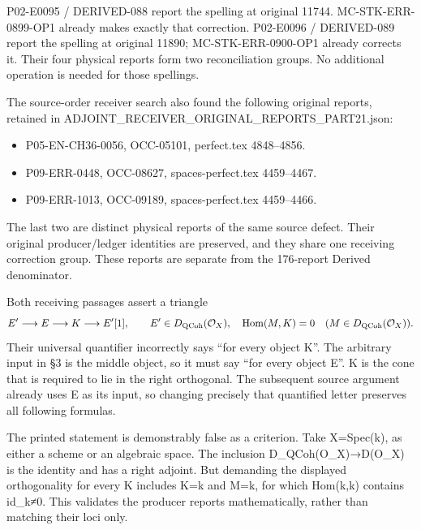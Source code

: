 \documentclass[11pt]{article}
\providecommand{\tightlist}{\setlength{\itemsep}{0pt}\setlength{\parskip}{0pt}}
\begin{document}
P02-E0095 /\allowbreak{} DERIVED-088 report the spelling at original 11744. MC-STK-ERR-0899-OP1 already makes exactly that correction. P02-E0096 /\allowbreak{} DERIVED-089 report the spelling at original 11890; MC-STK-ERR-0900-OP1 already corrects it. Their four physical reports form two reconciliation groups. No additional operation is needed for those spellings.

The source-order receiver search also found the following original reports,\allowbreak{} retained in ADJOINT\_\allowbreak{}RECEIVER\_\allowbreak{}ORIGINAL\_\allowbreak{}REPORTS\_\allowbreak{}PART21.json:\allowbreak{}

\begin{itemize}
\tightlist
\item
  P05-EN-CH36-0056,\allowbreak{} OCC-05101,\allowbreak{} perfect.tex 4848–\allowbreak{}4856.
\item
  P09-ERR-0448,\allowbreak{} OCC-08627,\allowbreak{} spaces-perfect.tex 4459–\allowbreak{}4467.
\item
  P09-ERR-1013,\allowbreak{} OCC-09189,\allowbreak{} spaces-perfect.tex 4459–\allowbreak{}4466.
\end{itemize}

The last two are distinct physical reports of the same source defect. Their original producer/\allowbreak{}ledger identities are preserved,\allowbreak{} and they share one receiving correction group. These reports are separate from the 176-report Derived denominator.

Both receiving passages assert a triangle \[
 E'\longrightarrow E\longrightarrow K\longrightarrow E'[1],
 \qquad E'\in D_{\rm QCoh}(\mathcal O_X),\quad
 \operatorname{Hom}(M,K)=0\quad(M\in D_{\rm QCoh}(\mathcal O_X)).
\] Their universal quantifier incorrectly says ``for every object K''. The arbitrary input in §3 is the middle object,\allowbreak{} so it must say ``for every object E''. K is the cone that is required to lie in the right orthogonal. The subsequent source argument already uses E as its input,\allowbreak{} so changing precisely that quantified letter preserves all following formulas.

The printed statement is demonstrably false as a criterion. Take X\allowbreak{}=Spec(k)\allowbreak{},\allowbreak{} as either a scheme or an algebraic space. The inclusion D\_\allowbreak{}QCoh(O\_\allowbreak{}X)\allowbreak{}\allowbreak{}→D(O\_\allowbreak{}X)\allowbreak{} is the identity and has a right adjoint. But demanding the displayed orthogonality for every K includes K\allowbreak{}=k and M\allowbreak{}=k,\allowbreak{} for which Hom(k,\allowbreak{}k)\allowbreak{} contains id\_\allowbreak{}k≠0. This validates the producer reports mathematically,\allowbreak{} rather than matching their loci only.
\end{document}
